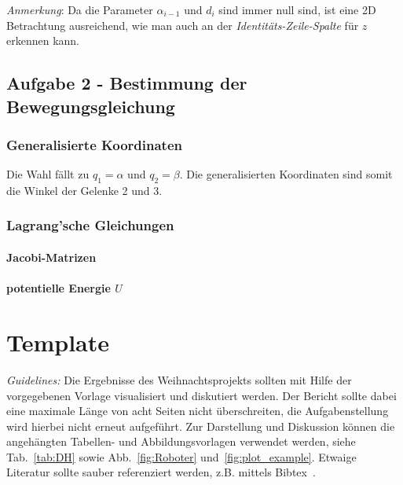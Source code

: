\documentclass{MSM_latex}
\begin{document}
\textit{Anmerkung}: Da die Parameter $\alpha_{i-1}$ und $d_i$ sind immer null sind, ist eine 2D Betrachtung ausreichend, wie man auch an der \emph{Identitäts-Zeile-Spalte} für $z$ erkennen kann.

\subsection*{Aufgabe 2 - Bestimmung der Bewegungsgleichung}

\subsubsection*{Generalisierte Koordinaten}
Die Wahl fällt zu $q_1 = \alpha$ und $q_2 = \beta$. Die generalisierten Koordinaten sind somit die Winkel der Gelenke 2 und 3.

\subsubsection*{Lagrang'sche Gleichungen}

\paragraph*{Jacobi-Matrizen}



\paragraph*{potentielle Energie $U$}



\newpage


\section*{Template}


\textit{Guidelines:} Die Ergebnisse des Weihnachtsprojekts sollten mit Hilfe der vorgegebenen Vorlage  visualisiert und diskutiert werden. 
Der Bericht sollte dabei eine maximale Länge von acht Seiten nicht überschreiten, die Aufgabenstellung wird hierbei nicht erneut aufgeführt. 
Zur Darstellung und Diskussion können die angehängten Tabellen- und Abbildungsvorlagen verwendet werden, siehe Tab.~\ref{tab:DH} sowie Abb.~\ref{fig:Roboter} und~\ref{fig:plot_example}. 
Etwaige Literatur sollte sauber referenziert werden, z.B. mittels Bibtex~\cite{FehrSchmidSchneiderEberhard20,Fuchs23, DenavitHartenberg55,Lipkin05}.
\end{document}
